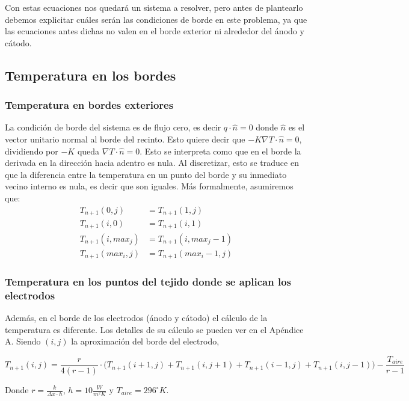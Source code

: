 \documentclass[a4paper]{article}
\begin{document}
Con estas ecuaciones nos quedará un sistema a resolver, pero antes de plantearlo debemos explicitar cuáles serán las condiciones de borde en este problema, ya que las ecuaciones antes dichas no valen en el borde exterior ni alrededor del ánodo y cátodo.

\subsection{Temperatura en los bordes}

\subsubsection{Temperatura en bordes exteriores}
La condición de borde del sistema es de flujo cero, es decir $q \cdot \hat{n} = 0$ donde $\hat{n}$ es el vector unitario normal al borde del recinto. Esto quiere decir que $-K \nabla T \cdot \hat{n} = 0$, dividiendo por $-K$ queda $\nabla T \cdot \hat{n} = 0$. Esto se interpreta como que en el borde la derivada en la dirección hacia adentro es nula. Al discretizar, esto se traduce en que la diferencia entre la temperatura en un punto del borde y su inmediato vecino interno es nula, es decir que son iguales. Más formalmente, asumiremos que:
\begin{equation*}
\begin{aligned}
T_{n+1}(0,j) & = T_{n+1}(1,j) \\ 
T_{n+1}(i,0) & = T_{n+1}(i,1) \\
T_{n+1}(i,max_j) & = T_{n+1}(i,max_j-1) \\ 
T_{n+1}(max_i,j) & = T_{n+1}(max_i-1,j)
\end{aligned}
\end{equation*}

\subsubsection{Temperatura en los puntos del tejido donde se aplican los electrodos}
Además, en el borde de los electrodos (ánodo y cátodo) el cálculo de la temperatura es diferente. Los detalles de su cálculo se pueden ver en el Apéndice A. Siendo $(i,j)$ la aproximación del borde del electrodo,

$$T_{n+1}(i,j) = \frac{r}{4(r-1)} \cdot \big( T_{n+1}(i+1,j) + T_{n+1}(i,j+1) + T_{n+1}(i-1,j) + T_{n+1}(i,j-1)\big) - \frac{T_{aire}}{r-1}$$

Donde $r = \frac{k}{\Delta x \cdot h}$, $h = 10 \frac{W}{m^2 K}$ y $T_{aire} = 296 ^\circ K$.\\ 
\end{document}
